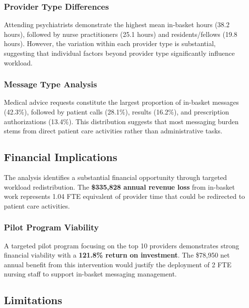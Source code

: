 \documentclass[
  11pt,
]{article}
\begin{document}
\subsubsection{Provider Type
Differences}\label{provider-type-differences}

Attending psychiatrists demonstrate the highest mean in-basket hours
(38.2 hours), followed by nurse practitioners (25.1 hours) and
residents/fellows (19.8 hours). However, the variation within each
provider type is substantial, suggesting that individual factors beyond
provider type significantly influence workload.

\subsubsection{Message Type Analysis}\label{message-type-analysis-1}

Medical advice requests constitute the largest proportion of in-basket
messages (42.3\%), followed by patient calls (28.1\%), results (16.2\%),
and prescription authorizations (13.4\%). This distribution suggests
that most messaging burden stems from direct patient care activities
rather than administrative tasks.

\subsection{Financial Implications}\label{financial-implications}

The analysis identifies a substantial financial opportunity through
targeted workload redistribution. The \textbf{\$335,828 annual revenue
loss} from in-basket work represents 1.04 FTE equivalent of provider
time that could be redirected to patient care activities.

\subsubsection{Pilot Program Viability}\label{pilot-program-viability}

A targeted pilot program focusing on the top 10 providers demonstrates
strong financial viability with a \textbf{121.8\% return on investment}.
The \$78,950 net annual benefit from this intervention would justify the
deployment of 2 FTE nursing staff to support in-basket messaging
management.

\subsection{Limitations}\label{limitations}
\end{document}
